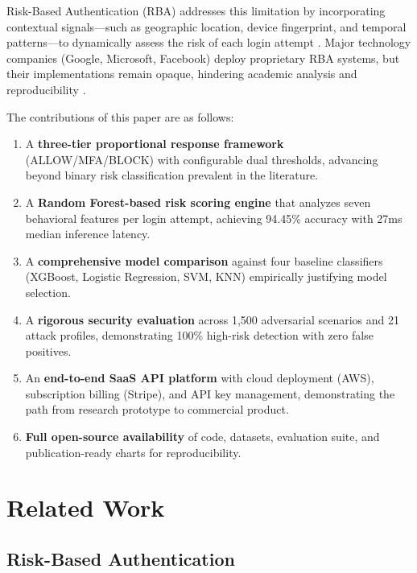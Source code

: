 \documentclass[conference]{IEEEtran}
\begin{document}
Risk-Based Authentication (RBA) addresses this limitation by incorporating contextual signals---such as geographic location, device fingerprint, and temporal patterns---to dynamically assess the risk of each login attempt \cite{wiefling2019}. Major technology companies (Google, Microsoft, Facebook) deploy proprietary RBA systems, but their implementations remain opaque, hindering academic analysis and reproducibility \cite{wiefling2021}.

The contributions of this paper are as follows:

\begin{enumerate}
\item A \textbf{three-tier proportional response framework} (ALLOW/MFA/BLOCK) with configurable dual thresholds, advancing beyond binary risk classification prevalent in the literature.
\item A \textbf{Random Forest-based risk scoring engine} that analyzes seven behavioral features per login attempt, achieving 94.45\% accuracy with 27ms median inference latency.
\item A \textbf{comprehensive model comparison} against four baseline classifiers (XGBoost, Logistic Regression, SVM, KNN) empirically justifying model selection.
\item A \textbf{rigorous security evaluation} across 1,500 adversarial scenarios and 21 attack profiles, demonstrating 100\% high-risk detection with zero false positives.
\item An \textbf{end-to-end SaaS API platform} with cloud deployment (AWS), subscription billing (Stripe), and API key management, demonstrating the path from research prototype to commercial product.
\item \textbf{Full open-source availability} of code, datasets, evaluation suite, and publication-ready charts for reproducibility.
\end{enumerate}

\section{Related Work}

\subsection{Risk-Based Authentication}
\end{document}
